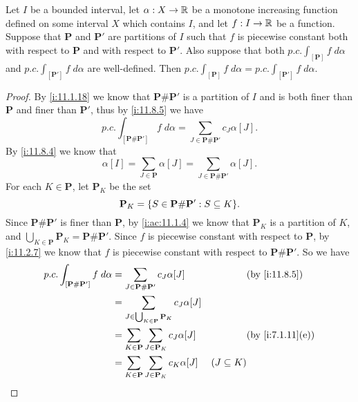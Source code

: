\begin{ac}\label{i:ac:11.8.4}
  Let \(I\) be a bounded interval, let \(\alpha : X \to \mathbb{R}\) be a monotone increasing function defined on some interval \(X\) which contains \(I\), and let \(f : I \to \mathbb{R}\) be a function.
  Suppose that \(\mathbf{P}\) and \(\mathbf{P}'\) are partitions of \(I\) such that \(f\) is piecewise constant both with respect to \(\mathbf{P}\) and with respect to \(\mathbf{P}'\).
  Also suppose that both \(p.c. \int_{[\mathbf{P}]} f \; d \alpha\) and \(p.c. \int_{[\mathbf{P}']} f \; d \alpha\) are well-defined.
  Then \(p.c. \int_{[\mathbf{P}]} f \; d \alpha = p.c. \int_{[\mathbf{P}']} f \; d \alpha\).
\end{ac}

\begin{proof}
  By \cref{i:11.1.18} we know that \(\mathbf{P} \# \mathbf{P}'\) is a partition of \(I\) and is both finer than \(\mathbf{P}\) and finer than \(\mathbf{P}'\), thus by \cref{i:11.8.5} we have
  \[
    p.c. \int_{[\mathbf{P} \# \mathbf{P}']} f \; d \alpha = \sum_{J \in \mathbf{P} \# \mathbf{P}'} c_J \alpha[J].
  \]
  By \cref{i:11.8.4} we know that
  \[
    \alpha[I] = \sum_{J \in \mathbf{P}} \alpha[J] = \sum_{J \in \mathbf{P} \# \mathbf{P}'} \alpha[J].
  \]
  For each \(K \in \mathbf{P}\), let \(\mathbf{P}_K\) be the set
  \[
    \mathbf{P}_K = \set{S \in \mathbf{P} \# \mathbf{P}' : S \subseteq K}.
  \]
  Since \(\mathbf{P} \# \mathbf{P}'\) is finer than \(\mathbf{P}\), by \cref{i:ac:11.1.4} we know that \(\mathbf{P}_K\) is a partition of \(K\), and \(\bigcup_{K \in \mathbf{P}} \mathbf{P}_K = \mathbf{P} \# \mathbf{P}'\).
  Since \(f\) is piecewise constant with respect to \(\mathbf{P}\), by \cref{i:11.2.7} we know that \(f\) is piecewise constant with respect to \(\mathbf{P} \# \mathbf{P}'\).
  So we have
  \begin{align*}
    p.c. \int_{[\mathbf{P} \# \mathbf{P}']} f \; d \alpha & = \sum_{J \in \mathbf{P} \# \mathbf{P}'} c_J \alpha[J]                        &                 & \by{i:11.8.5}    \\
                                                          & = \sum_{J \in \bigcup_{K \in \mathbf{P}} \mathbf{P}_K} c_J \alpha[J]                                               \\
                                                          & = \sum_{K \in \mathbf{P}} \sum_{J \in \mathbf{P}_K} c_J \alpha[J]             &                 & \by{i:7.1.11}[e] \\
                                                          & = \sum_{K \in \mathbf{P}} \sum_{J \in \mathbf{P}_K} c_K \alpha[J]             & (J \subseteq K)                    \\

\end{align*}
\end{proof}
